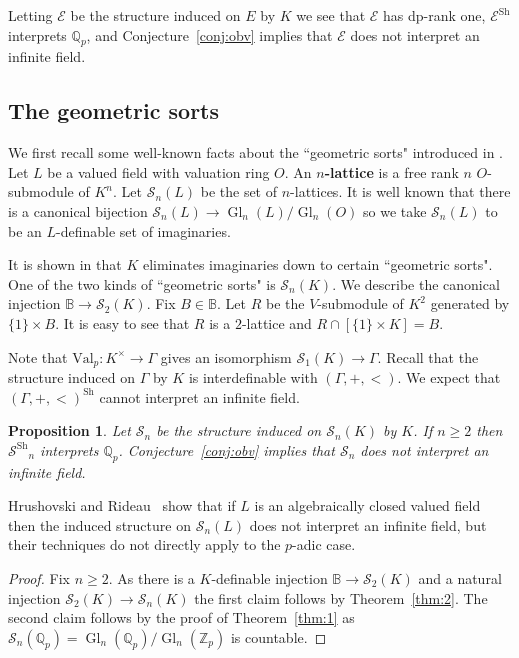 \documentclass[bibalpha]{amsart}
\newtheorem{prop}[theorem]{Proposition}
\theoremstyle{definition}
\theoremstyle{remark}
\newcommand{\valp}{\mathrm{Val}_p}
\newcommand{\Sh}[1]{\ensuremath{\mathscr{#1}^{\mathrm{Sh}}}}
\newcommand{\Cal}[1]{\ensuremath{\mathcal{#1}}}
\newcommand{\Sa}[1]{\ensuremath{\mathscr{#1}}}
\newcommand{\B}{\mathbb{B}}
\newcommand{\Z}{\mathbb{Z}}
\newcommand{\Q}{\mathbb{Q}}
\DeclareMathOperator{\Gl}{Gl}
\begin{document}
\noindent
Letting $\Sa E$ be the structure induced on $E$ by $K$ we see that $\Sa E$ has dp-rank one, $\Sh E$ interprets $\Q_p$, and Conjecture~\ref{conj:obv} implies that $\Sa E$ does not interpret an infinite field.

\subsection{The geometric sorts}
We first recall some well-known facts about the ``geometric sorts" introduced in \cite{Haskell2006}.
Let $L$ be a valued field with valuation ring $O$.
An \textbf{$n$-lattice} is a free rank $n$ $O$-submodule of $K^n$.
Let $\Cal S_n(L)$ be the set of $n$-lattices.
It is well known that there is a canonical bijection $\Cal S_n(L) \to \Gl_n(L)/\Gl_n(O)$ so we take $\Cal S_n(L)$ to be an $L$-definable set of imaginaries.
\newline

\noindent
It is shown in \cite{Hrushovski2018} that $K$ eliminates imaginaries down to certain ``geometric sorts".
One of the two kinds of ``geometric sorts" is $\mathcal{S}_n(K)$.
We describe the canonical injection $\B \to \Cal S_2(K)$.
Fix $B \in \B$.
Let $R$ be the $V$-submodule of $K^2$ generated by $\{1\} \times B$.
It is easy to see that $R$ is a $2$-lattice and $R \cap [\{1\} \times K] = B$.
\newline

\noindent
Note that $\valp : K^\times \to \Gamma$ gives an isomorphism $\Cal S_1(K) \to \Gamma$.
Recall that the structure induced on $\Gamma$ by $K$ is interdefinable with $(\Gamma,+,<)$.
We expect that $(\Gamma,+,<)^{\mathrm{Sh}}$ cannot interpret an infinite field.

\begin{prop}
\label{prop:geometric-sorts}
Let $\Sa S_n$ be the structure induced on $\Cal S_n(K)$ by $K$.
If $n \geq 2$ then $\Sh S_n$ interprets $\Q_p$.
Conjecture~\ref{conj:obv} implies that $\Sa S_n$ does not interpret an infinite field.
\end{prop}

\noindent
Hrushovski and Rideau~\cite{metastable} show that if $L$ is an algebraically closed valued field then the induced structure on $\Cal S_n(L)$ does not interpret an infinite field, but their techniques do not directly apply to the $p$-adic case.

\begin{proof}
Fix $n \geq 2$.
As there is a $K$-definable injection $\B \to \Cal S_2(K)$ and a natural injection $\Cal S_2(K) \to \Cal S_n(K)$ the first claim follows by Theorem~\ref{thm:2}.
The second claim follows by the proof of Theorem~\ref{thm:1} as $\Cal S_n(\Q_p) = \Gl_n(\Q_p)/\Gl_n(\Z_p)$ is countable.
\end{proof}
\end{document}
